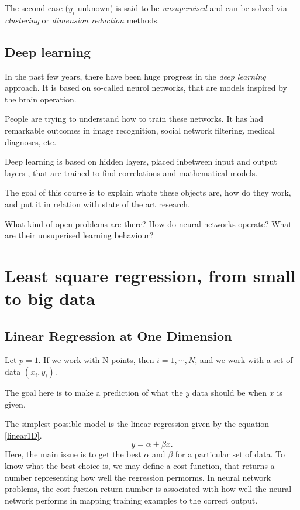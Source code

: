 \documentclass[a4paper]{tufte-book}
\begin{document}
The second case ($y_i$ unknown) is said to be \emph{unsupervised} and can be
solved via \emph{clustering} or \emph{dimension reduction} methods.

\section*{Deep learning}

In the past few years, there have been huge progress in the \emph{deep learning}
approach. It is based on so-called neurol networks, that are models inspired
by the brain operation.

People are trying to understand how to train these networks. It has had
remarkable outcomes in image recognition, social network filtering, medical
diagnoses, etc.

Deep learning is based on hidden layers, placed inbetween input and output layers
, that are trained to find correlations and mathematical models.

The goal of this course is to explain whate these objects are, how do they work,
and put it in relation with state of the art research.

What kind of open problems are there? How do neural networks operate? What are
their unsuperised learning behaviour?


\tableofcontents\thispagestyle{empty}

\mainmatter

\chapter{Least square regression, from small to big data}
\label{ch:least-square}

\section{Linear Regression at One Dimension}

Let $p =1$. If we work with N points, then $i=1,\cdots,N$, and we work with a
set of data $(x_i,y_i)$.

The goal here is to make a prediction of what the $y$ data should be when $x$ is
given.

The simplest possible model is the linear regression given by the equation 
\ref{linear1D}.
\begin{equation}
    y=\alpha + \beta x.
    \label{linear1D}
\end{equation}
Here, the main issue is to get the best $\alpha$ and $\beta$ for a particular set
of data. To know what the best choice is, we may define a cost function, that
returns a number representing how well the regression permorms. In neural network
problems, the cost fuction return number is associated with how well the neural
network performs in mapping training examples to the correct output.
\end{document}
